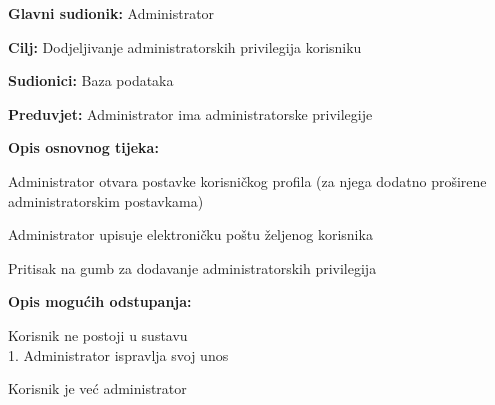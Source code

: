 					
					\noindent {}
					\begin{packed_item}
						\item \textbf{Glavni sudionik:} Administrator
						\item \textbf{Cilj:} Dodjeljivanje administratorskih privilegija korisniku
						\item \textbf{Sudionici:} Baza podataka
						\item \textbf{Preduvjet:} Administrator ima administratorske privilegije
						\item \textbf{Opis osnovnog tijeka:}
						\begin{packed_enum}
							\item Administrator otvara postavke korisničkog profila (za njega dodatno proširene administratorskim postavkama)
							\item Administrator upisuje elektroničku poštu željenog korisnika 
							\item Pritisak na gumb za dodavanje administratorskih privilegija
						\end{packed_enum}
						\item \textbf{Opis mogućih odstupanja:}
						\begin{packed_item}
							\item [2.a] Korisnik ne postoji u sustavu
							\\1. Administrator ispravlja svoj unos
							\item [3.a] Korisnik je već administrator
						\end{packed_item}
					\end{packed_item}

